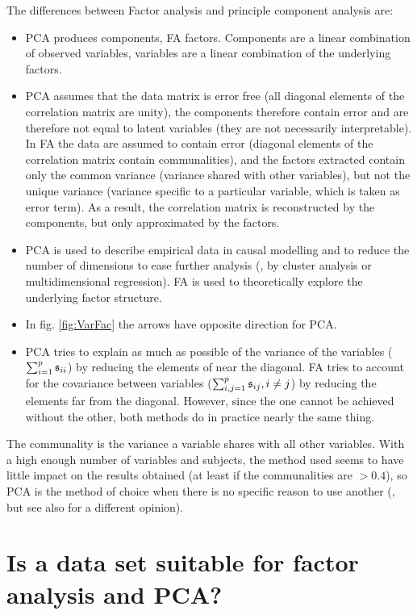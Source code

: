 \begin{refsection}
The differences between Factor analysis and principle component analysis are:
\begin{itemize}
  \item{\acs{PCA} produces components, \acs{FA} factors. Components are a linear combination of observed variables, variables are a linear combination of the underlying factors.}
  \item{\acs{PCA} assumes that the data matrix is error free (all diagonal elements of the correlation matrix are unity), the components therefore contain error and are therefore not equal to latent variables (they are not necessarily interpretable). In \acs{FA} the data are assumed to contain error (diagonal elements of the correlation matrix contain communalities), and the factors extracted contain only the common variance (variance shared with other variables), but not the unique variance (variance specific to a particular variable, which is taken as error term). As a result, the correlation matrix is reconstructed by the components, but only approximated by the factors.}
  \item{\acs{PCA} is used to describe empirical data in causal modelling and to reduce the number of dimensions to ease further analysis (, by cluster analysis or multidimensional regression). \acs{FA} is used to theoretically explore the underlying factor structure.}
  \item{In fig. \ref{fig:VarFac} the arrows have opposite direction for \acs{PCA}.}
  \item{\acs{PCA} tries to explain as much as possible of the variance of the variables (\( \sum_{i=1}^p{\mathfrak{s}_{ii}} \)) by reducing the elements of  near the diagonal. \acs{FA} tries to account for the covariance between variables (\( \sum_{i,j=1}^p{\mathfrak{s}_{ij}}, i \neq j \)) by reducing the elements far from the diagonal. However, since the one cannot be achieved without the other, both methods do in practice nearly the same thing. }
\end{itemize}
The communality is the variance a variable shares with all other variables. With a high enough number of variables and subjects, the method used seems to have little impact on the results obtained (at least if the communalities are \(> 0.4 \)), so \acs{PCA} is the method of choice when there is no specific reason to use another (\parencite{Wil-10}, but see also \parencite{Cos-05} for a different opinion).

\section{Is a data set suitable for factor analysis and \acs{PCA}?}


\end{refsection}
